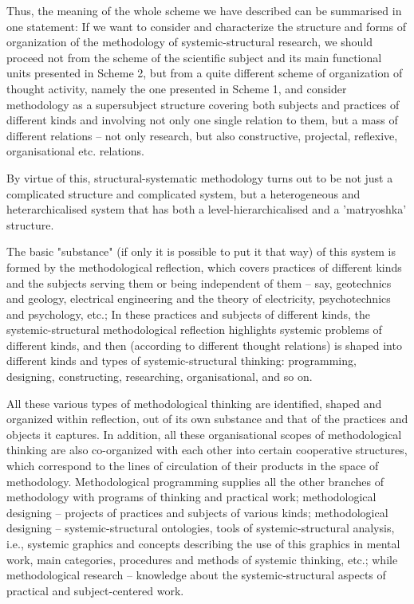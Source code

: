 \documentclass[11pt,a4paper]{article}
\begin{document}
Thus, the meaning of the whole scheme we have described can be summarised in
one statement: If we want to consider and characterize the structure and forms
of organization of the methodology of systemic-structural research, we should
proceed not from the scheme of the scientific subject and its main functional
units presented in Scheme 2, but from a quite different scheme of organization
of thought activity, namely the one presented in Scheme 1, and consider
methodology as a supersubject structure covering both subjects and practices
of different kinds and involving not only one single relation to them, but a
mass of different relations – not only research, but also constructive,
projectal, reflexive, organisational etc. relations.

By virtue of this, structural-systematic methodology turns out to be not just
a complicated structure and complicated system, but a heterogeneous and
heterarchicalised system that has both a level-hierarchicalised and a
'matryoshka' structure.

The basic "substance" (if only it is possible to put it that way) of this
system is formed by the methodological reflection, which covers practices of
different kinds and the subjects serving them or being independent of them –
say, geotechnics and geology, electrical engineering and the theory of
electricity, psychotechnics and psychology, etc.; In these practices and
subjects of different kinds, the systemic-structural methodological reflection
highlights systemic problems of different kinds, and then (according to
different thought relations) is shaped into different kinds and types of
systemic-structural thinking: programming, designing, constructing,
researching, organisational, and so on.

All these various types of methodological thinking are identified, shaped and
organized within reflection, out of its own substance and that of the
practices and objects it captures. In addition, all these organisational
scopes of methodological thinking are also co-organized with each other into
certain cooperative structures, which correspond to the lines of circulation
of their products in the space of methodology. Methodological programming
supplies all the other branches of methodology with programs of thinking and
practical work; methodological designing – projects of practices and subjects
of various kinds; methodological designing – systemic-structural ontologies,
tools of systemic-structural analysis, i.e., systemic graphics and concepts
describing the use of this graphics in mental work, main categories,
procedures and methods of systemic thinking, etc.; while methodological
research – knowledge about the systemic-structural aspects of practical and
subject-centered work.
\end{document}
